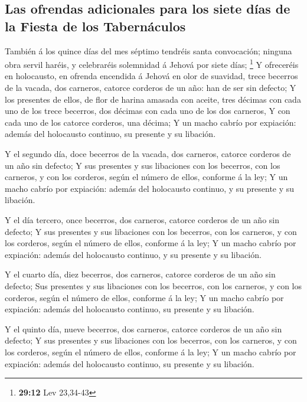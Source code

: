 \hypertarget{las-ofrendas-adicionales-para-los-siete-duxedas-de-la-fiesta-de-los-tabernuxe1culos}{%
\subsection{Las ofrendas adicionales para los siete días de la Fiesta de
los
Tabernáculos}\label{las-ofrendas-adicionales-para-los-siete-duxedas-de-la-fiesta-de-los-tabernuxe1culos}}

 También á los quince días del mes séptimo tendréis santa
convocación; ninguna obra servil haréis, y celebraréis solemnidad á
Jehová por siete días; \footnote{\textbf{29:12} Lev 23,34-43}
 Y ofreceréis en holocausto, en ofrenda encendida á
Jehová en olor de suavidad, trece becerros de la vacada, dos carneros,
catorce corderos de un año: han de ser sin defecto;  Y
los presentes de ellos, de flor de harina amasada con aceite, tres
décimas con cada uno de los trece becerros, dos décimas con cada uno de
los dos carneros,  Y con cada uno de los catorce
corderos, una décima;  Y un macho cabrío por expiación:
además del holocausto continuo, su presente y su libación.

 Y el segundo día, doce becerros de la vacada, dos
carneros, catorce corderos de un año sin defecto;  Y sus
presentes y sus libaciones con los becerros, con los carneros, y con los
corderos, según el número de ellos, conforme á la ley;  Y
un macho cabrío por expiación: además del holocausto continuo, y su
presente y su libación.

 Y el día tercero, once becerros, dos carneros, catorce
corderos de un año sin defecto;  Y sus presentes y sus
libaciones con los becerros, con los carneros, y con los corderos, según
el número de ellos, conforme á la ley;  Y un macho cabrío
por expiación: además del holocausto continuo, y su presente y su
libación.

 Y el cuarto día, diez becerros, dos carneros, catorce
corderos de un año sin defecto;  Sus presentes y sus
libaciones con los becerros, con los carneros, y con los corderos, según
el número de ellos, conforme á la ley;  Y un macho cabrío
por expiación: además del holocausto continuo, su presente y su
libación.

 Y el quinto día, nueve becerros, dos carneros, catorce
corderos de un año sin defecto;  Y sus presentes y sus
libaciones con los becerros, con los carneros, y con los corderos, según
el número de ellos, conforme á la ley;  Y un macho cabrío
por expiación: además del holocausto continuo, su presente y su
libación.

